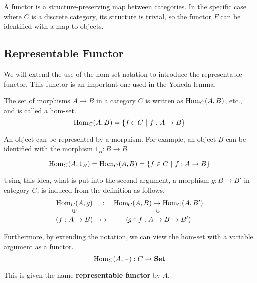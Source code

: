 \documentclass[uplatex,a4j,12pt,dvipdfmx]{jsarticle}
\begin{document}
A functor is a structure-preserving map between categories.
In the specific case where $C$ is a discrete category, its structure is trivial, so the functor $F$ can be identified with a map to objects.

\subsection{Representable Functor}

We will extend the use of the hom-set notation to introduce the representable functor.
This functor is an important one used in the Yoneda lemma.

The set of morphisms $A \to B$ in a category $C$ is written as ${\rm Hom}_{C}(A,B)$, etc., and is called a hom-set.
$${\rm Hom}_{C}(A,B) = \{ f \in C \ | \ f : A \to B\}$$

An object can be represented by a morphism.
For example, an object $B$ can be identified with the morphism $1_{B}: B \to B$.

\[
	{\rm Hom}_{C}(A,1_{B}) = {\rm Hom}_{C}(A,B) = \{ f \in C \ | \ f : A \to B\}
\]

Using this idea, what is put into the second argument, a morphism
$g : B \to B'$
in category $C$, is induced from the definition as follows.
\[
	\begin{array}{ccc}
		{\rm Hom}_{C}(A,g)      & :       & {\rm Hom}_{C}(A,B) \to {\rm Hom}_{C}(A,B') \\
		\rotatebox{90}{${\in}$} &         & \rotatebox{90}{${\in}$}                    \\
		(f : A \to B)           & \mapsto & (g \circ f : A \to B \to B')
	\end{array}
\]

Furthermore, by extending the notation, we can view the hom-set with a variable argument as a functor.
\[
	{\rm Hom}_{C}(A,-) : C \to \mathbf{Set}
\]

This is given the name \textbf{representable functor} by $A$.
\end{document}
